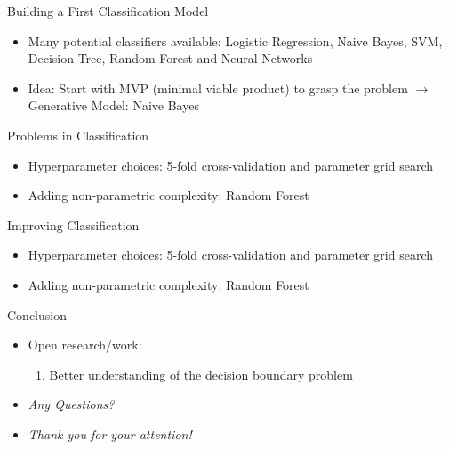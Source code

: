 \documentclass{beamer}
\begin{document}
\begin{frame}{Building a First Classification Model}

\begin{itemize}
	\item Many potential classifiers available: Logistic Regression, Naive Bayes, SVM,
Decision Tree, Random Forest and Neural Networks
	\item Idea: Start with MVP (minimal viable product) to grasp the problem $\to$ Generative Model: Naive Bayes
\end{itemize}
\end{frame}

\begin{frame}{Problems in Classification}

\begin{itemize}
	\item Hyperparameter choices: 5-fold cross-validation and parameter grid search
	\item Adding non-parametric complexity: Random Forest
\end{itemize}

\end{frame}

\begin{frame}{Improving Classification}

\begin{itemize}
	\item Hyperparameter choices: 5-fold cross-validation and parameter grid search
	\item Adding non-parametric complexity: Random Forest
\end{itemize}

\end{frame}


\begin{frame}{Conclusion}

\begin{itemize}
\item Open research/work:
\begin{enumerate}
\item Better understanding of the decision boundary problem
\end{enumerate}
\item \Large{\textit{Any Questions?}}
\item \Large{\textit{Thank you for your attention!}}
\end{itemize}


\end{frame}
\end{document}
